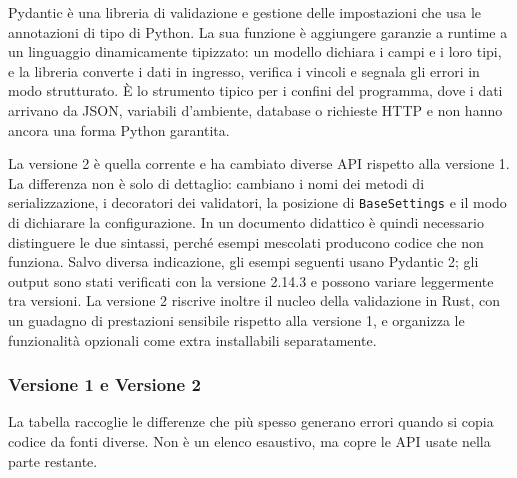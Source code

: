 \documentclass[12pt]{extarticle}
\begin{document}
\noindent Pydantic è una libreria di validazione e gestione delle impostazioni che usa le annotazioni di tipo di Python. La sua funzione è aggiungere garanzie a runtime a un linguaggio dinamicamente tipizzato: un modello dichiara i campi e i loro tipi, e la libreria converte i dati in ingresso, verifica i vincoli e segnala gli errori in modo strutturato. È lo strumento tipico per i confini del programma, dove i dati arrivano da JSON, variabili d'ambiente, database o richieste HTTP e non hanno ancora una forma Python garantita.

\noindent La versione 2 è quella corrente e ha cambiato diverse API rispetto alla versione 1. La differenza non è solo di dettaglio: cambiano i nomi dei metodi di serializzazione, i decoratori dei validatori, la posizione di \texttt{BaseSettings} e il modo di dichiarare la configurazione. In un documento didattico è quindi necessario distinguere le due sintassi, perché esempi mescolati producono codice che non funziona. Salvo diversa indicazione, gli esempi seguenti usano Pydantic 2; gli output sono stati verificati con la versione 2.14.3 e possono variare leggermente tra versioni. La versione 2 riscrive inoltre il nucleo della validazione in Rust, con un guadagno di prestazioni sensibile rispetto alla versione 1, e organizza le funzionalità opzionali come extra installabili separatamente.

\subsubsection{Versione 1 e Versione 2}

\noindent La tabella raccoglie le differenze che più spesso generano errori quando si copia codice da fonti diverse. Non è un elenco esaustivo, ma copre le API usate nella parte restante.
\end{document}
